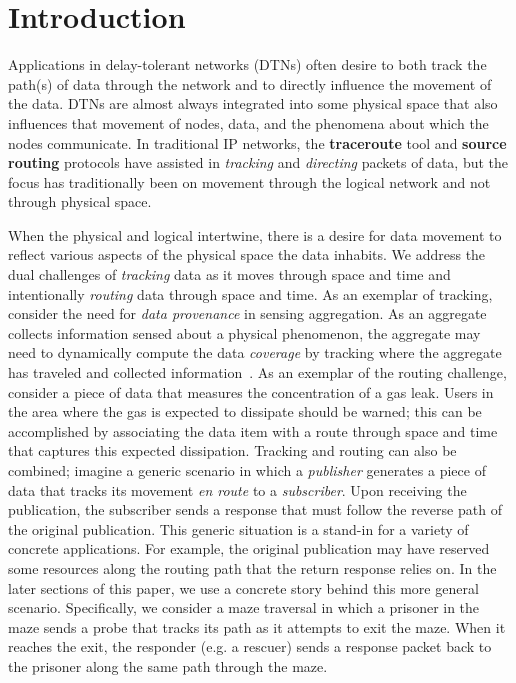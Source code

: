 %
%
\section{Introduction}
Applications in delay-tolerant networks (DTNs) often desire to both track the path(s) of data through the network and to directly influence the movement of the data. DTNs are almost always integrated into some physical space that also influences that movement of nodes, data, and the phenomena about which the nodes communicate. In traditional IP networks, the {\bf traceroute} tool and {\bf source routing} protocols have assisted in {\em tracking} and {\em directing} packets of data, but the focus has traditionally been on movement through the logical network and not through physical space.

When the physical and logical intertwine, there is a desire for data movement to reflect various aspects of the physical space the data inhabits. We address the dual challenges of {\em tracking} data as it moves through space and time and intentionally {\em routing} data through space and time. As an exemplar of tracking, consider the need for {\em data provenance} in sensing aggregation. As an aggregate collects information sensed about a physical phenomenon, the aggregate may need to dynamically compute the data {\em coverage} by tracking where the aggregate has traveled and collected information~\cite{michel12:spatiotemporal}. As an exemplar of the routing challenge, consider a piece of data that measures the concentration of a gas leak. Users in the area where the gas is expected to dissipate should be warned; this can be accomplished by associating the data item with a route through space and time that captures this expected dissipation. Tracking and routing can also be combined; imagine a generic scenario in which a {\em publisher} generates a piece of data that tracks its movement {\em en route} to a {\em subscriber}. Upon receiving the publication, the subscriber sends a response that must follow the reverse path of the original publication. This generic situation is a stand-in for a variety of concrete applications. For example, the original publication may have reserved some resources along the routing path that the return response relies on. In the later sections of this paper, we use a concrete story behind this more general scenario. Specifically, we consider a maze traversal in which a prisoner in the maze sends a probe that tracks its path as it attempts to exit the maze. When it reaches the exit, the responder (e.g. a rescuer) sends a response packet back to the prisoner along the same path through the maze.

